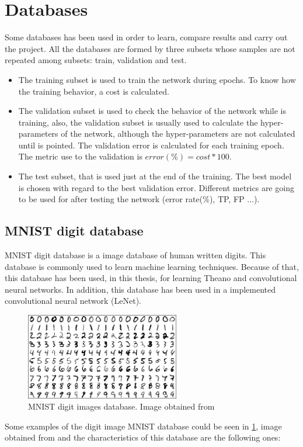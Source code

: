 \section{Databases}
Some databases has been used in order to learn, compare results and carry out the project. All the databases are formed by three subsets whose samples are not repeated among subsets: train, validation and test.

\begin{itemize}
\item The training subset is used to train the network during epochs. To know how the training behavior, a cost is calculated.
\item The validation subset is used to check the behavior of the network while is training, also, the validation subset is usually used to calculate the hyper-parameters of the network, although the hyper-parameters are not calculated until is pointed. The validation error is calculated for each training epoch. The metric use to the validation is $error(\%) = cost*100$.
\item  The test subset, that is used just at the end of the training. The best model is chosen with regard to the best validation error. Different metrics are going to be used for after testing the network (error rate(\%), TP, FP ...).
\end{itemize}

\subsection{MNIST digit database}\label{subsec:MNIST}
MNIST digit database is a image database of human written digits. This database is commonly used to learn machine learning techniques. Because of that, this database has been used, in this thesis, for learning Theano and convolutional neural networks. In addition, this database has been used in a implemented convolutional neural network (LeNet).\\
\begin{figure}[htb]
\centering
\includegraphics[width=0.6\textwidth]{images_databases/mnistExamples.png}
\caption{MNIST digit images database. Image obtained from \cite{MNISTimage}} \label{fig:MNIST_digits}
\end{figure}
Some examples of the digit image MNIST database could be seen in \ref{fig:MNIST_digits}, image obtained from \cite{MNISTimage} and the characteristics of this database are the following ones:

